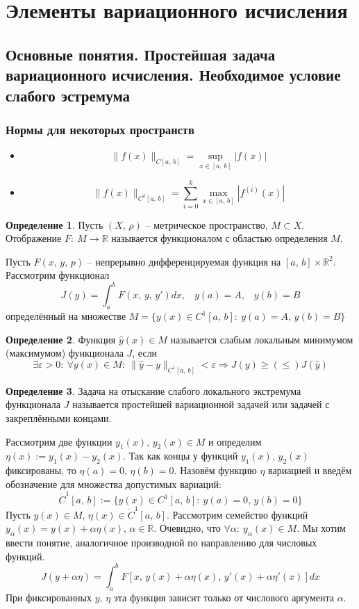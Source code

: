 \documentclass[a4paper,12pt]{article}
\renewcommand{\leq}{\ensuremath{\leqslant}}
\renewcommand{\geq}{\ensuremath{\geqslant}}
\theoremstyle{plain}
\theoremstyle{definition}
\newtheorem{definition}{Определение}[section]
\theoremstyle{remark}
\begin{document}
\section{Элементы вариационного исчисления}
\subsection{Основные понятия. Простейшая задача вариационного исчисления. Необходимое условие слабого эстремума}
\subsubsection*{Нормы для некоторых пространств}
\begin{itemize}
	\item \[\|f(x)\|_{C[a,\,b]} = \sup_{x \in [a,\,b]} |f(x)|\]
	\item \[\|f(x)\|_{C^k[a,\,b]} = \sum_{i = 0}^k\max_{x \in [a,\,b]}|f^{(i)}(x)|\]
\end{itemize}

\begin{definition}
	Пусть $(X,\,\rho)$ -- метрическое пространство, $M \subset X$. Отображение $F:\: M \to \mathbb{R}$ называется функционалом с областью определения $M$.
\end{definition}

Пусть $F(x,\,y,\,p)$ -- непрерывно дифференцируемая функция на $[a,\,b] \times \mathbb{R}^2$. Рассмотрим функционал
\[J(y) = \int_a^b F(x,\,y,\,y')dx,\;\;\; y(a) = A,\;\;\; y(b) = B\]
определённый на множестве $M = \{y(x) \in C^1[a,\,b]:\: y(a) = A,\, y(b) = B\}$

\begin{definition}
	Функция $\hat{y}(x) \in M$ называется слабым локальным минимумом (максимумом) функционала $J$, если
	\[
		\exists \varepsilon > 0:\: \forall y(x) \in M:\: \|\hat{y} - y\|_{C^1[a,\,b]} < \varepsilon \Rightarrow J(y) \geq(\leq) J(\hat{y})
	\]
\end{definition}

\begin{definition}
	Задача на отыскание слабого локального экстремума функционала $J$ называется простейшей вариационной задачей или задачей с закреплёнными концами.
\end{definition}

Рассмотрим две функции $y_1(x),\, y_2(x) \in M$ и определим $\eta(x) := y_1(x) - y_2(x)$. Так как концы у функций $y_1(x),\, y_2(x)$ фиксированы, то $\eta(a) = 0,\, \eta(b) = 0$. Назовём функцию $\eta$ вариацией и введём обозначение для множества допустимых вариаций:
\[\dot{C}^1[a,\,b] := \{y(x) \in C^1[a,\,b]:\: y(a) = 0,\, y(b) = 0\}\]
Пусть $y(x) \in M,\, \eta(x) \in \dot{C}^1[a,\,b]$. Рассмотрим семейство функций $y_\alpha(x) = y(x) + \alpha\eta(x),\, \alpha \in \mathbb{R}$. Очевидно, что $\forall \alpha:\: y_\alpha(x) \in M$. Мы хотим ввести понятие, аналогичное производной по направлению для числовых функций.
\[J(y + \alpha \eta) = \int_a^b F[x,\, y(x) + \alpha\eta(x),\, y'(x) + \alpha\eta'(x)]dx\]
При фиксированных $y,\,\eta$ эта функция зависит только от числового аргумента $\alpha$.
\end{document}

